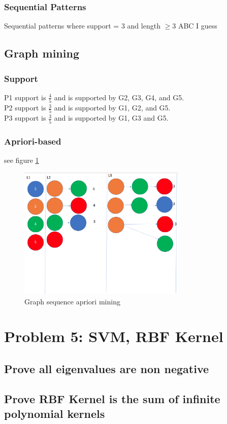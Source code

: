 \documentclass[11pt]{article}
\begin{document}
\subsubsection{Sequential Patterns}
Sequential patterns where support = 3 and length $\ge 3$
ABC I guess
\subsection{Graph mining}
\subsubsection{Support}
P1 support is $\frac{4}{5}$ and is supported by G2, G3, G4, and G5. \\
P2 support is $\frac{3}{5}$ and is supported by G1, G2, and G5. \\
P3 support is $\frac{3}{5}$ and is supported by G1, G3 and G5.
\subsubsection{Apriori-based}
see figure \ref{fig:graph-apri}
\begin{figure}[]
\centering
\includegraphics[width=8cm]{Assignments/Assignment1/graphapri.png}
\caption{Graph sequence apriori mining}
\label{fig:graph-apri}
\end{figure}
\section{Problem 5: SVM, RBF Kernel}
\subsection{Prove all eigenvalues are non negative}
\subsection{Prove RBF Kernel is the sum of infinite polynomial kernels}
\end{document}
